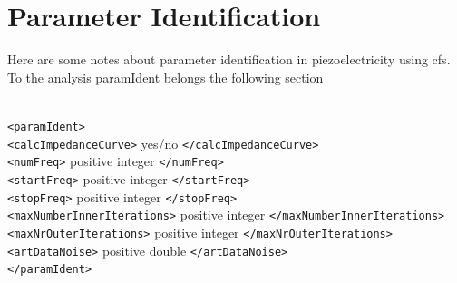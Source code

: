 \chapter{Parameter Identification} \label{paramIdent}
%
%
Here are some notes about parameter identification in piezoelectricity using cfs. 
To the analysis paramIdent belongs the following section

\begin{center}
\begin{minipage}{0.6\textwidth}
\begin{tabbing}
\quad\=\\ \kill
\verb!<paramIdent>!\\
\> \verb!<calcImpedanceCurve>! yes/no \verb!</calcImpedanceCurve>!\\
\> \verb!<numFreq>! positive integer \verb!</numFreq>! \\
\> \verb!<startFreq>! positive integer \verb!</startFreq>! \\
\> \verb!<stopFreq>! positive integer \verb!</stopFreq>! \\
\> \verb!<maxNumberInnerIterations>! positive integer \verb!</maxNumberInnerIterations>! \\
\> \verb!<maxNrOuterIterations>! positive integer \verb!</maxNrOuterIterations>! \\
\> \verb!<artDataNoise>! positive double \verb!</artDataNoise>! \\
\verb!</paramIdent>!\\
\end{tabbing}
\end{minipage}
\end{center}

